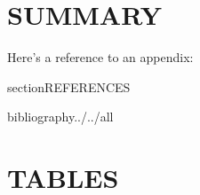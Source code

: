 \documentclass[11pt]{book}\usepackage[]{graphicx}\usepackage[]{color}
\begin{document}
\bigskip


\section{SUMMARY}

Here's a reference to an appendix: %

{section}{REFERENCES}

bibliography{../../all}
\clearpage

\section{TABLES}

\end{document}
